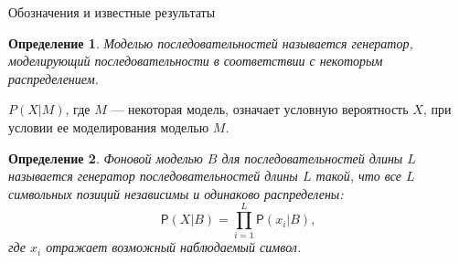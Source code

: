 \documentclass[ucs, notheorems, handout, 10pt]{beamer}
\newtheorem{defenition}{Определение}
\begin{document}
	\begin{frame}{Обозначения и известные результаты}
		\begin{defenition}
			Моделью последовательностей называется генератор, моделирующий последовательности в соответствии с некоторым распределением. 
		\end{defenition}
	
		$P(X|M)$, где $M$ --- некоторая модель, означает условную вероятность $X$, при условии ее моделирования моделью $M$.
	
		\begin{defenition}
			Фоновой моделью $B$ для последовательностей длины $L$ называется генератор последовательностей длины $L$ такой, что все $L$ символьных позиций независимы и одинаково распределены:
			\begin{equation*}
				\mathsf{P}(X|B) = \prod_{i=1}^{L}\mathsf{P}(x_{i}|B), \label{eq:4}
			\end{equation*}
			где $x_i$ отражает возможный наблюдаемый символ.
		\end{defenition}
		
		
	\end{frame}
	
\end{document}

